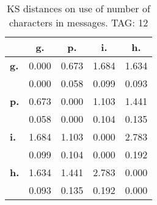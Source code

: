\begin{table}[h!]
\begin{center}
\begin{tabular}{| l || c | c | c | c |}\hline
 & {\bf g.} & {\bf p.} & {\bf i.} & {\bf h.} \\\hline\hline
{\bf g.} & 0.000 & 0.673 & 1.684 & 1.634 \\
{\bf } & 0.000 & 0.058 & 0.099 & 0.093 \\\hline
{\bf p.} & 0.673 & 0.000 & 1.103 & 1.441 \\
{\bf } & 0.058 & 0.000 & 0.104 & 0.135 \\\hline
{\bf i.} & 1.684 & 1.103 & 0.000 & 2.783 \\
{\bf } & 0.099 & 0.104 & 0.000 & 0.192 \\\hline
{\bf h.} & 1.634 & 1.441 & 2.783 & 0.000 \\
{\bf } & 0.093 & 0.135 & 0.192 & 0.000 \\\hline
\end{tabular}
\caption{KS distances on use of number of characters in messages. TAG: 12}
\end{center}
\end{table}